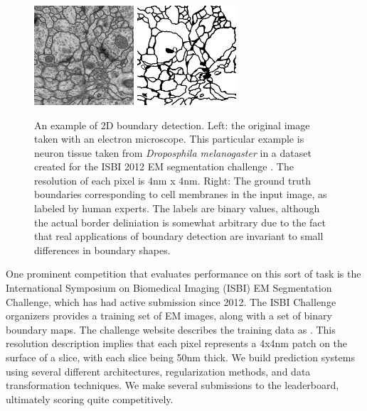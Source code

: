 \begin{figure}[h]
    \centering
	\includegraphics[width=0.33\textwidth]{img/isbi_raw_example}
	\hspace{1cm}
	\includegraphics[width=0.33\textwidth]{img/isbi_label_example}
    \caption{An example of 2D boundary detection. Left: the original image taken with an electron microscope. This particular example is neuron tissue taken from \textit{Droposphila melanogaster} in a dataset created for the ISBI 2012 EM segmentation challenge \cite{Arganda-Carreras2015}. The resolution of each pixel is 4nm x 4nm. Right: The ground truth boundaries corresponding to cell membranes in the input image, as labeled by human experts. The labels are binary values, although the actual border deliniation is somewhat arbitrary due to the fact that real applications of boundary detection are invariant to small differences in boundary shapes.}
    \label{fig:isbi_example}
\end{figure}

One prominent competition that evaluates performance on this sort of task is the International Symposium on Biomedical Imaging (ISBI) EM Segmentation Challenge, which has had active submission since 2012. The ISBI Challenge organizers provides a training set of EM images, along with a set of binary boundary maps. The challenge website describes the training data as \cite{Arganda-Carreras2015}. This resolution description implies that each pixel represents a 4x4nm patch on the surface of a slice, with each slice being 50nm thick. We build prediction systems using several different architectures, regularization methods, and data transformation techniques. We make several submissions to the leaderboard, ultimately scoring quite competitively.

